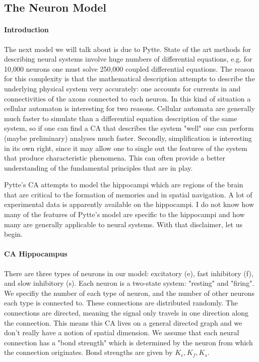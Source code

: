\documentclass[12pt]{article}
\numberwithin{equation}{section}
\begin{document}
\subsection{The Neuron Model}
\paragraph{Introduction \\}
The next model we will talk about is due to Pytte. State of the art methods for describing neural systems involve huge numbers of differential equations, e.g. for 10,000 neurons one must solve 250,000 coupled differential equations. The reason for this complexity is that the mathematical description attempts to describe the underlying physical system very accurately: one accounts for currents in and connectivities of the axons connected to each neuron. In this kind of situation a cellular automaton is interesting for two reasons. Cellular automata are generally much faster to simulate than a differential equation description of the same system, so if one can find a CA that describes the system "well" one can perform (maybe preliminary) analyses much faster. Secondly, simplification is interesting in its own right, since it may allow one to single out the features of the system that produce characteristic phenomena. This can often provide a better understanding of the fundamental principles that are in play.

Pytte's CA attempts to model the hippocampi which are regions of the brain that are critical to the formation of memories and in spatial navigation. A lot of experimental data is apparently available on the hippocampi. I do not know how many of the features of Pytte's model are specific to the hippocampi and how many are generally applicable to neural systems. With that disclaimer, let us begin.

\paragraph{CA Hippocampus\\}
There are three types of neurons in our model: excitatory (e), fast inhibitory (f), and slow inhibitory (s). Each neuron is a two-state system: "resting" and "firing". We specifiy the number of each type of neuron, and the number of other neurons each type is connected to. These connections are distributed randomly. The connections are directed, meaning the signal only travels in one direction along the connection. This means this CA lives on a general directed graph and we don't really have a notion of spatial dimension. We assume that each neural connection has a "bond strength" which is determined by the neuron from which the connection originates. Bond strengths are given by \(K_e, K_f, K_s\).
\end{document}
